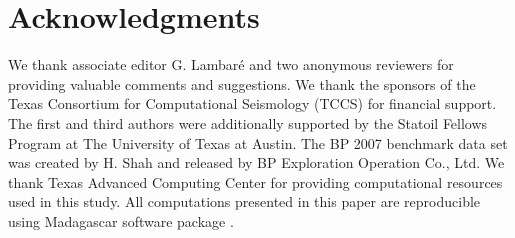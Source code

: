 \section{Acknowledgments}
We thank associate editor G. Lambar\'{e} and two anonymous reviewers for providing valuable comments and suggestions.
We thank the sponsors of the Texas Consortium for Computational Seismology (TCCS) for financial support.
The first and third authors were additionally supported by the Statoil Fellows Program at The University of Texas at Austin.
The BP 2007 benchmark data set was created by H. Shah and released by BP Exploration Operation Co., Ltd.
We thank Texas Advanced Computing Center for providing computational resources used in this study.
All computations presented in this paper are reproducible using Madagascar software package \cite[]{fomel13b}.



